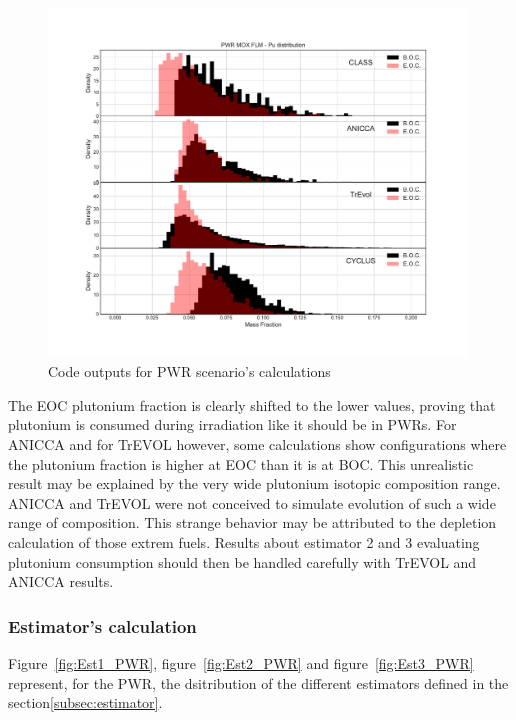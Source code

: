 \begin{figure}[h]
	\begin{center}
		\includegraphics[width = 0.99\textwidth]{../../Feature_1/RAW_DATA/FIG/PWR_MOX_FLM_Pu.pdf}
		\caption{Code outputs for \gls{PWR} scenario's calculations}
		\label{fig:PWR_MOX_FLM_Pu}
	\end{center}
\end{figure}

The EOC plutonium fraction is clearly shifted to the lower values, proving that
plutonium is consumed during irradiation like it should be in \gls{PWR}s. For ANICCA
and for TrEVOL however, some calculations show configurations where the
plutonium fraction is higher at EOC than it is at \gls{BOC}. This unrealistic
result may be explained by the very wide plutonium isotopic composition range.
ANICCA and TrEVOL were not conceived to simulate evolution of such a wide range
of composition. This strange behavior may be attributed to the depletion
calculation of those extrem fuels. Results about estimator 2 and 3 evaluating
plutonium consumption should then be handled carefully with TrEVOL and ANICCA
results.   


\subsubsection{Estimator's calculation}

Figure~\ref{fig:Est1_PWR}, figure~\ref{fig:Est2_PWR} and
figure~\ref{fig:Est3_PWR} represent, for the \gls{PWR}, the dsitribution of the
different estimators defined in the section\ref{subsec:estimator}. 

